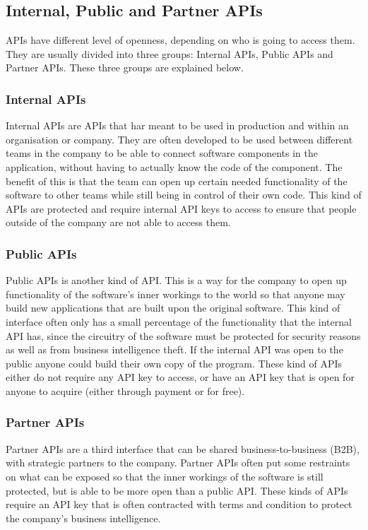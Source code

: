 \documentclass{cslthse-msc}
\begin{document}
    \subsection{Internal, Public and Partner APIs}
    APIs have different level of openness, depending on who is going to access them. They are
    usually divided into three groups: Internal APIs, Public APIs and Partner APIs. These
    three groups are explained below.
    \subsubsection{Internal APIs}
    Internal APIs are APIs that har meant to be used in production and
    within an organisation or company. They are often developed to be used
    between different teams in the company to be able to connect software
    components in the application, without having to actually know the code
    of the component. The benefit of this is that the team can open up certain
    needed functionality of the software to other teams while still being in
    control of their own code. This kind of APIs are protected and require
    internal API keys to access to ensure that people outside of the company
    are not able to access them.
    \subsubsection{Public APIs}
    Public APIs is another kind of API. This is a way for the company to
    open up functionality of the software's inner workings to the world so
    that anyone may build new applications that are built upon the original
    software. This kind of interface often only has a small percentage of
    the functionality that the internal API has, since the circuitry of the
    software must be protected for security reasons as well as from business
    intelligence theft. If the internal API was open to the public anyone
    could build their own copy of the program. These kind of APIs either do
    not require any API key to access, or have an API key that is open for
    anyone to acquire (either through payment or for free).
    \subsubsection{Partner APIs}
    Partner APIs are a third interface that can be shared
    business-to-business (B2B), with strategic partners to the company.
    Partner APIs often put some restraints on what can be exposed so that
    the inner workings of the software is still protected, but is able to be
    more open than a public API. These kinds of APIs require an API key that
    is often contracted with terms and condition to protect the company's
    business intelligence.\citet{levin}
\end{document}
